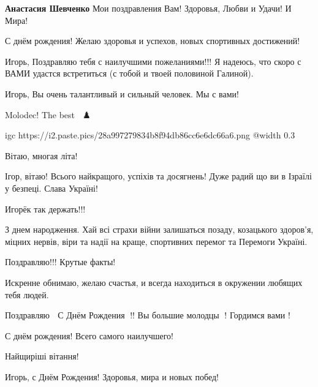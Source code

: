 \begin{itemize} %
\textbf{Анастасия Шевченко} Мои поздравления Вам! Здоровья, Любви и Удачи! И Мира!
\end{itemize} %


С днём рождения! Желаю здоровья и успехов, новых спортивных достижений!


Игорь, Поздравляю тебя с наилучшими пожеланиями!!! Я надеюсь, что скоро с ВАМИ
удастся встретиться (с тобой и твоей половиной Галиной).


Игорь, Вы очень талантливый и сильный человек. Мы с вами!


Molodec! The best 💪🥳♟️

\ifcmt
  igc https://i2.paste.pics/28a997279834b8f94db86cc6e6dc66a6.png
	@width 0.3
\fi


Вітаю, многая літа!


Ігор, вітаю! Всього найкращого, успіхів та досягнень! Дуже радий що ви в
Ізраїлі у безпеці. Слава Україні!


Игорёк так держать!!!


З днем народження. Хай всі страхи війни залишаться позаду, козацького здоров'я,
міцних нервів, віри та надії на краще, спортивних перемог та Перемоги Україні.


Поздравляю!!! Крутые факты!

Искренне обнимаю, желаю счастья, и всегда находиться в окружении любящих тебя
людей.💞💯💯💯💥


Поздравляю 🍾 С Днём Рождения 🎁!! Вы большие молодцы 👏! Гордимся вами !


С днём рождения! Всего самого наилучшего!


Найщиріші вітання! 🫶


Игорь, с Днём Рождения! Здоровья, мира и новых побед!

